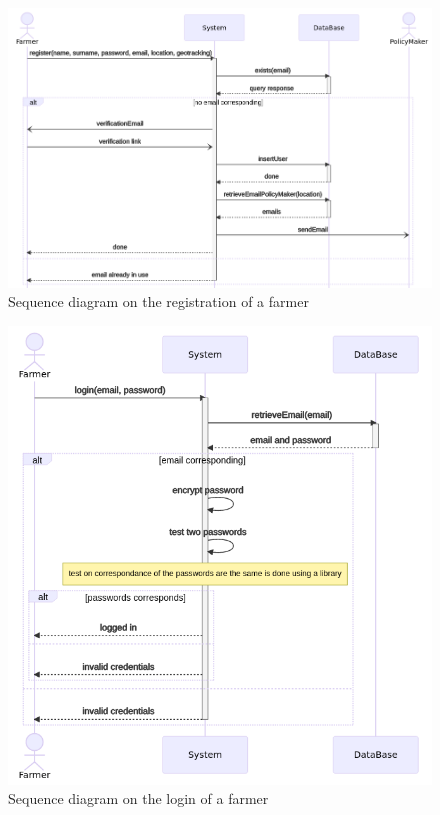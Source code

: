 \begin{figure}[H]
	
	\centering
	
	\includegraphics[width=\textwidth]{Images/seq_registration.png}
	
	\caption{\label{fig:seqregistration} Sequence diagram on the registration of a farmer}
	
\end{figure}



\begin{figure}[H]
	
	\centering
	
	\includegraphics[width=\textwidth]{Images/seq_login.png}
	
	\caption{\label{fig:seqlogin} Sequence diagram on the login of a farmer}
	
\end{figure}




